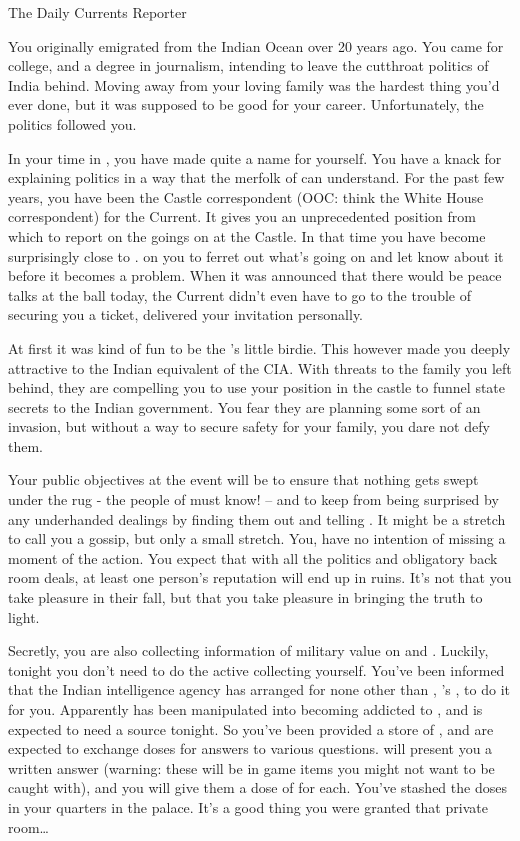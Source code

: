 \documentclass[char]{NeptuneBall}
\begin{document}
\name{\cReporter{}}

The Daily Currents Reporter

You originally emigrated from the Indian Ocean over 20 years ago. You came for college, and a degree in journalism, intending to leave the cutthroat politics of India behind. Moving away from your loving family was the hardest thing you'd ever done, but it was supposed to be good for your career. Unfortunately, the politics followed you.

In your time in \pAtlantis{}, you have made quite a name for yourself. You have a knack for explaining politics in a way that the merfolk of \pAtlantis{} can understand. For the past few years, you have been the Castle correspondent (OOC: think the White House correspondent) for the Current. It gives you an unprecedented position from which to report on the goings on at the Castle. In that time you have become surprisingly close to \cKing{\King} \cKing{}. \cKing{\They}  on you to ferret out what's going on and let \cKing{\them} know about it before it becomes a problem.  When it was announced that there would be peace talks at the ball today, the Current didn't even have to go to the trouble of securing you a ticket, \cKing{\King} \cKing{} delivered your invitation personally.

At first it was kind of fun to be the \cKing{\King}'s little birdie. This however made you deeply attractive to the Indian equivalent of the CIA. With threats to the family you left behind, they are compelling you to use your position in the castle to funnel state secrets to the Indian government. You fear they are planning some sort of an invasion, but without a way to secure safety for your family, you dare not defy them.

Your public objectives at the event will be to ensure that nothing gets swept under the rug - the people of \pAtlantis{} must know! -- and to keep \cKing{\King} \cKing{} from being surprised by any underhanded dealings by finding them out and telling \cKing{\them}. It might be a stretch to call you a gossip, but only a small stretch. You, have no intention of missing a moment of the action. You expect that with all the politics and obligatory back room deals, at least one person’s reputation will end up in ruins. It's not that you take pleasure in their fall, but that you take pleasure in bringing the truth to light.

Secretly, you are also collecting information of military value on \pAtlantis{} and \pPacifica{}. Luckily, tonight you don't need to do the active collecting yourself. You've been informed that the Indian intelligence agency has arranged for none other than \cWillow{}, \cAriel{}'s \cWillow{\offspring}, to do it for you. Apparently \cWillow{} has been manipulated into becoming addicted to \iDrug{\MYname}, and is expected to need a source tonight. So you've been provided a store of \iDrug{}, and are expected to exchange doses for answers to various questions. \cWillow{} will present you a written answer (warning: these will be in game items you might not want to be caught with), and you will give them a dose of \iDrug{} for each. You've stashed the doses in your quarters in the palace. It's a good thing you were granted that private room\ldots{}
\end{document}
